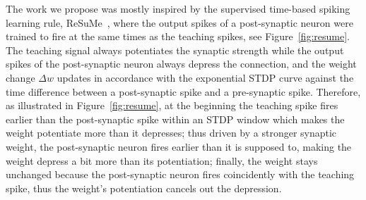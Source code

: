 The work we propose was mostly inspired by the supervised time-based spiking learning rule, ReSuMe~\citep{ponulak2010supervised}, where the output spikes of a post-synaptic neuron were trained to fire at the same times as the teaching spikes, see Figure~\ref{fig:resume}.
The teaching signal always potentiates the synaptic strength while the output spikes of the post-synaptic neuron always depress the connection, and the weight change $\Delta w$ updates in accordance with the exponential STDP curve against the time difference between a post-synaptic spike and a pre-synaptic spike.
Therefore, as illustrated in Figure~\ref{fig:resume}, at the beginning the teaching spike fires earlier than the post-synaptic spike within an STDP window which makes the weight potentiate more than it depresses;
thus driven by a stronger synaptic weight, the post-synaptic neuron fires earlier than it is supposed to, making the weight depress a bit more than its potentiation;
finally, the weight stays unchanged because the post-synaptic neuron fires coincidently with the teaching spike, thus the weight's potentiation cancels out the depression.
